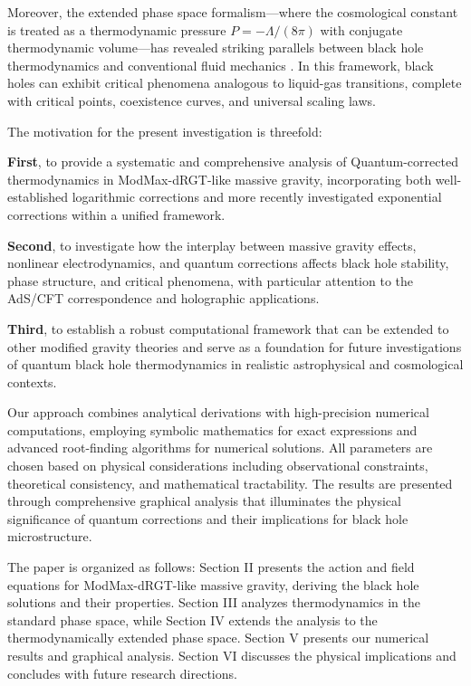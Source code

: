 \documentclass[superscriptaddress, prd, aps,amsmath,amssymb,showpacs,showkeys, onecolumn]{revtex4-2}
\begin{document}
Moreover, the extended phase space formalism—where the cosmological constant is treated as a thermodynamic pressure $P = -\Lambda/(8\pi)$ with conjugate thermodynamic volume—has revealed striking parallels between black hole thermodynamics and conventional fluid mechanics \cite{Kastor2009,Dolan2011}. In this framework, black holes can exhibit critical phenomena analogous to liquid-gas transitions, complete with critical points, coexistence curves, and universal scaling laws.

The motivation for the present investigation is threefold: 

\textbf{First}, to provide a systematic and comprehensive analysis of Quantum-corrected thermodynamics in ModMax-dRGT-like massive gravity, incorporating both well-established logarithmic corrections and more recently investigated exponential corrections within a unified framework.

\textbf{Second}, to investigate how the interplay between massive gravity effects, nonlinear electrodynamics, and quantum corrections affects black hole stability, phase structure, and critical phenomena, with particular attention to the AdS/CFT correspondence and holographic applications.

\textbf{Third}, to establish a robust computational framework that can be extended to other modified gravity theories and serve as a foundation for future investigations of quantum black hole thermodynamics in realistic astrophysical and cosmological contexts.

Our approach combines analytical derivations with high-precision numerical computations, employing symbolic mathematics for exact expressions and advanced root-finding algorithms for numerical solutions. All parameters are chosen based on physical considerations including observational constraints, theoretical consistency, and mathematical tractability. The results are presented through comprehensive graphical analysis that illuminates the physical significance of quantum corrections and their implications for black hole microstructure.

The paper is organized as follows: Section II presents the action and field equations for ModMax-dRGT-like massive gravity, deriving the black hole solutions and their properties. Section III analyzes thermodynamics in the standard phase space, while Section IV extends the analysis to the thermodynamically extended phase space. Section V presents our numerical results and graphical analysis. Section VI discusses the physical implications and concludes with future research directions.
\end{document}
